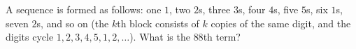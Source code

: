 A sequence is formed as follows: one $1$, two $2$s, three $3$s, four $4$s, five $5$s, six $1$s, seven $2$s, and so on (the $k$th block consists of $k$ copies of the same digit, and the digits cycle $1,2,3,4,5,1,2,\dots$). What is the $88$th term?
